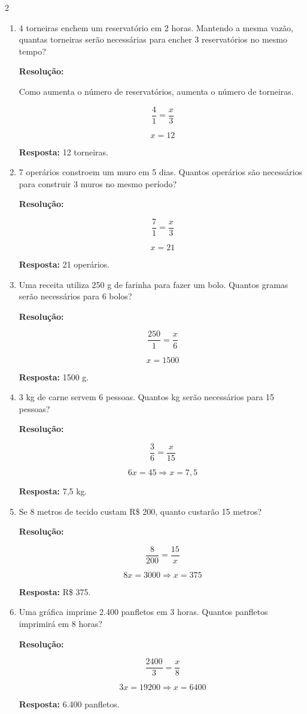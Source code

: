 \documentclass[11pt]{article}
\begin{document}
\begin{multicols}{2}
\begin{enumerate}[leftmargin=*]
\[
x = 150 \cdot 18 = 2700
\]

\textbf{Resposta:} R\$ 2.700.

\item 4 torneiras enchem um reservatório em 2 horas. Mantendo a mesma vazão, quantas torneiras serão necessárias para encher 3 reservatórios no mesmo tempo?

\textbf{Resolução:}

Como aumenta o número de reservatórios, aumenta o número de torneiras.

\[
\frac{4}{1} = \frac{x}{3}
\]

\[
x = 12
\]

\textbf{Resposta:} 12 torneiras.

\item 7 operários constroem um muro em 5 dias. Quantos operários são necessários para construir 3 muros no mesmo período?

\textbf{Resolução:}

\[
\frac{7}{1} = \frac{x}{3}
\]

\[
x = 21
\]

\textbf{Resposta:} 21 operários.

\item Uma receita utiliza 250 g de farinha para fazer um bolo. Quantos gramas serão necessários para 6 bolos?

\textbf{Resolução:}

\[
\frac{250}{1} = \frac{x}{6}
\]

\[
x = 1500
\]

\textbf{Resposta:} 1500 g.

\item 3 kg de carne servem 6 pessoas. Quantos kg serão necessários para 15 pessoas?

\textbf{Resolução:}

\[
\frac{3}{6} = \frac{x}{15}
\]

\[
6x = 45
\Rightarrow x = 7{,}5
\]

\textbf{Resposta:} 7,5 kg.

\item Se 8 metros de tecido custam R\$ 200, quanto custarão 15 metros?

\textbf{Resolução:}

\[
\frac{8}{200} = \frac{15}{x}
\]

\[
8x = 3000
\Rightarrow x = 375
\]

\textbf{Resposta:} R\$ 375.

\item Uma gráfica imprime 2.400 panfletos em 3 horas. Quantos panfletos imprimirá em 8 horas?

\textbf{Resolução:}

\[
\frac{2400}{3} = \frac{x}{8}
\]

\[
3x = 19200
\Rightarrow x = 6400
\]

\textbf{Resposta:} 6.400 panfletos.

\end{enumerate}

\end{multicols}
\end{document}
